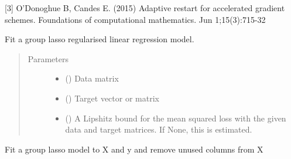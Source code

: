 \documentclass[letterpaper,10pt,english]{sphinxmanual}
\begin{document}
{\begin{fulllineitems}
{[}3{]} O’Donoghue B, Candes E. (2015) Adaptive restart for accelerated
gradient schemes. Foundations of computational mathematics.
Jun 1;15(3):715-32

\begin{fulllineitems}
\label{\detokenize{api_reference:group_lasso.GroupLasso.fit}}
Fit a group lasso regularised linear regression model.
\begin{quote}\begin{description}
\item[{Parameters}] \leavevmode\begin{itemize}
\item {} 
 () \textendash{} Data matrix

\item {} 
 () \textendash{} Target vector or matrix

\item {} 
 (\sphinxstyleliteralemphasis{\sphinxupquote{ {[}}}\sphinxstyleliteralemphasis{\sphinxupquote{{]}}}) \textendash{} A Lipshitz bound for the mean squared loss with the given
data and target matrices. If None, this is estimated.

\end{itemize}

\end{description}\end{quote}

\end{fulllineitems}


\begin{fulllineitems}
\label{\detokenize{api_reference:group_lasso.GroupLasso.fit_transform}}
Fit a group lasso model to X and y and remove unused columns from X


\end{fulllineitems}
\end{fulllineitems}}
\end{document}
